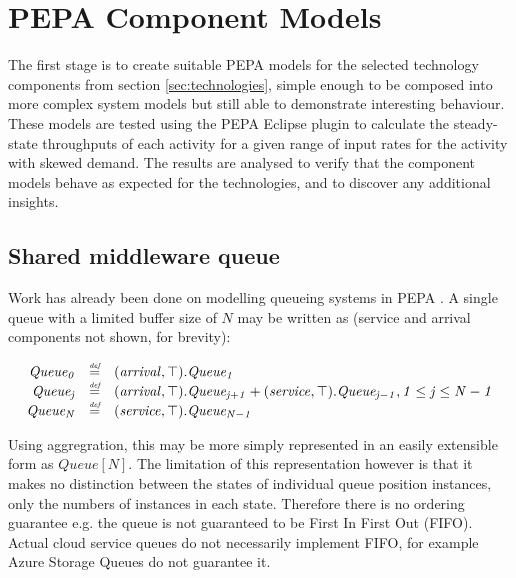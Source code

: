 %
%

\section{PEPA Component Models}\label{sec:pepa-component-models}

The first stage is to create suitable PEPA models for the selected technology components from section \ref{sec:technologies}, simple enough to be composed into more complex system models but still able to demonstrate interesting behaviour.  These models are tested using the PEPA Eclipse plugin \cite{RN1080} to calculate the steady-state throughputs of each activity for a given range of input rates for the activity with skewed demand.  The results are analysed to verify that the component models behave as expected for the technologies, and to discover any additional insights.

%
%
\FloatBarrier
\subsection{Shared middleware queue}

Work has already been done on modelling queueing systems in PEPA \cite{RN75}.  A single queue with a limited buffer size of $\mathit{N}$ may be written as (service and arrival components not shown, for brevity):

\begin{displaymath}
\begin{array}{rcl}
\mathit{Queue_0} & \stackrel{\mbox{\em {\tiny def}}}{=} & (\mathit{arrival},\mathit{\top}).\mathit{Queue_1}\\
\mathit{Queue_j} & \stackrel{\mbox{\em {\tiny def}}}{=} & (\mathit{arrival},\mathit{\top}).\mathit{Queue_{j+1}} + (\mathit{service},\mathit{\top}).\mathit{Queue_{j-1}}, \mathit{1 \le j \le N-1}\\
\mathit{Queue_N} & \stackrel{\mbox{\em {\tiny def}}}{=} & (\mathit{service},\mathit{\top}).\mathit{Queue_{N-1}}\\
\end{array}
\end{displaymath}

Using aggregration, this may be more simply represented in an easily extensible form as $\mathit{Queue[N]}$.  The limitation of this representation however is that it makes no distinction between the states of individual queue position instances, only the numbers of instances in each state.  Therefore there is no ordering guarantee e.g. the queue is not guaranteed to be First In First Out (FIFO).  Actual cloud service queues do not necessarily implement FIFO, for example Azure Storage Queues \cite{RN1072} do not guarantee it.

